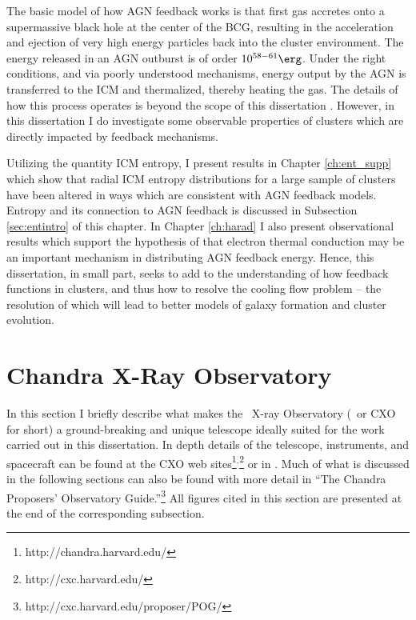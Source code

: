The basic model of how AGN feedback works is that first gas accretes
onto a supermassive black hole at the center of the BCG, resulting in
the acceleration and ejection of very high energy particles back into
the cluster environment. The energy released in an AGN outburst is of
order $10^{58-61} \erg$. Under the right conditions, and via poorly
understood mechanisms, energy output by the AGN is transferred to the
ICM and thermalized, thereby heating the gas. The details of how this
process operates is beyond the scope of this dissertation
\citep[see][for a recent review]{mcnamrev}. However, in this
dissertation I do investigate some observable properties of clusters
which are directly impacted by feedback mechanisms.

Utilizing the quantity ICM entropy, I present results in Chapter
\ref{ch:ent_supp} which show that radial ICM entropy distributions for
a large sample of clusters have been altered in ways which are
consistent with AGN feedback models. Entropy and its connection to AGN
feedback is discussed in Subsection \ref{sec:entintro} of this
chapter. In Chapter \ref{ch:harad} I also present observational
results which support the hypothesis of \citet{conduction} that
electron thermal conduction may be an important mechanism in
distributing AGN feedback energy. Hence, this dissertation, in small
part, seeks to add to the understanding of how feedback functions in
clusters, and thus how to resolve the cooling flow problem -- the
resolution of which will lead to better models of galaxy formation and
cluster evolution.

\section{Chandra X-Ray Observatory}
\label{sec:chandra}

In this section I briefly describe what makes the \chandra\ X-ray
Observatory (\chandra\ or CXO for short) a ground-breaking and unique
telescope ideally suited for the work carried out in this
dissertation. In depth details of the telescope, instruments, and
spacecraft can be found at the CXO web
sites\footnote{http://chandra.harvard.edu/}$^{,}$\footnote{http://cxc.harvard.edu/}
or in \citet{chandra}. Much of what is discussed in the following
sections can also be found with more detail in ``The Chandra
Proposers' Observatory
Guide.''\footnote{http://cxc.harvard.edu/proposer/POG/} All figures
cited in this section are presented at the end of the corresponding
subsection.


